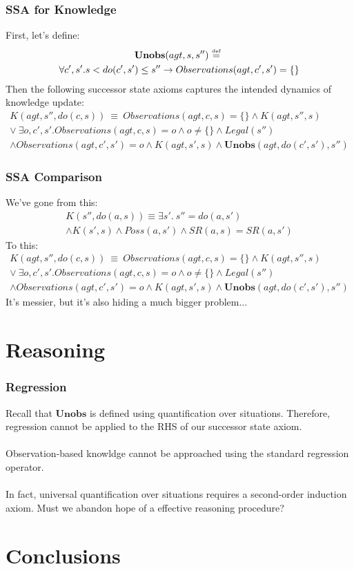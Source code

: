 \documentclass{beamer}
\newcommand{\isdef}{\hbox{$\stackrel{\mbox{\tiny def}}{=}$}}
\begin{document}
\begin{frame}
\frametitle{SSA for Knowledge}
First, let's define:
\begin{multline*}
  \mathbf{Unobs}(agt,s,s'')\ \isdef\ \\
    \forall c',s' . s < do(c',s') \leq s'' \rightarrow Observations(agt,c',s') = \{\}
\end{multline*}
Then the following successor state axioms captures the intended dynamics of
knowledge update:
\begin{multline*}
  K(agt,s'',do(c,s))\ \equiv\ Observations(agt,c,s) = \{\} \wedge K(agt,s'',s)\\
  \vee\ \exists o,c',s'.Observations(agt,c,s) = o \wedge o  \neq \{\} \wedge Legal(s'') \\
  \wedge Observations(agt,c',s')= o \wedge K(agt,s',s) \wedge \mathbf{Unobs}(agt,do(c',s'),s'')
\end{multline*}
\end{frame}

\begin{frame}
\frametitle{SSA Comparison}
We've gone from this:
\begin{multline*}
 K(s'',do(a,s)) \equiv \exists s' . \ s''=do(a,s') \\
 \wedge K(s',s) \wedge Poss(a,s') \wedge SR(a,s) = SR(a,s')
\end{multline*}
\pause
To this:
\begin{multline*}
  K(agt,s'',do(c,s))\ \equiv\ Observations(agt,c,s) = \{\} \wedge K(agt,s'',s)\\
  \vee\ \exists o,c',s'.Observations(agt,c,s) = o \wedge o  \neq \{\} \wedge Legal(s'') \\
  \wedge Observations(agt,c',s')= o \wedge K(agt,s',s) \wedge \mathbf{Unobs}(agt,do(c',s'),s'')
\end{multline*}
\pause
It's messier, but it's also hiding a much bigger problem...
\end{frame}

\section{Reasoning}

\begin{frame}
\frametitle{Regression}
Recall that $\mathbf{Unobs}$ is defined using quantification over situations.
Therefore, regression cannot be applied to the RHS of our successor state axiom.
\ \\
\ \\
Observation-based knowldge \alert{cannot} be approached using
the standard regression operator.
\ \\
\ \\
\pause
In fact, universal quantification over situations requires a
second-order induction axiom.
Must we abandon hope of a effective reasoning procedure?
\end{frame}

\section{Conclusions}

\begin{frame}
\end{frame}
\end{document}
